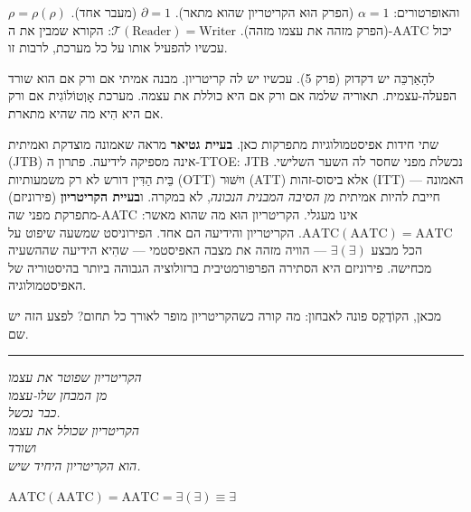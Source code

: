 \documentclass[10pt, openany, oneside]{book}
\begin{document}
והאופרטורים: $\alpha = 1$ (הפרק הוּא הקריטריון שהוא מתאר). $\partial = 1$ (מעבר אחד). $\rho = \rho(\rho)$ (הפרק מזהה את עצמו מזהה). $\mathcal{T}(\text{Reader}) = \text{Writer}$: הקורא שמבין את ה-AATC יכול עכשיו להפעיל אותו על כל מערכת, לרבות זו.

\vspace{2em}

להָאַרְכֵּה יש דקדוק (פרק 5). עכשיו יש לה קריטריון. מבנה אמיתי אם ורק אם הוא שורד הפעלה-עצמית. תאוריה שלמה אם ורק אם היא כוללת את עצמה. מערכת אָוְטוֹלוֹגִית אם ורק אם היא הִיא מה שהיא מתארת.

שתי חידות אפיסטמולוגיות מתפרקות כאן. \textbf{בעיית גטיאר} מראה שאמונה מוצדקת ואמיתית (JTB) אינה מספיקה לידיעה. פתרון ה-TTOE: JTB נכשלת מפני שחסר לה השער השלישי. בֵּית הַדִּין דורש לא רק משמעותיות (OTT) ויִשּׁוּר (ATT) אלא ביסוס-זהות (ITT) — האמונה חייבת להיות אמיתית \textit{מן הסיבה המבנית הנכונה}, לא במקרה. ו\textbf{בעיית הקריטריון} (פירוניזם) מתפרקת מפני שה-AATC אינו מעגלי. הקריטריון הוּא מה שהוא מאשר: $\text{AATC}(\text{AATC}) = \text{AATC}$. הקריטריון והידיעה הם אחד. הפירוניסט שמשעה שיפוט על הכל מבצע $\exists(\exists)$ — הוויה מזהה את מצבה האפיסטמי — שהִיא הידיעה שההשעיה מכחישה. פירוניזם היא הסתירה הפרפורמטיבית ברזולוציה הגבוהה ביותר בהיסטוריה של האפיסטמולוגיה.

מכאן, הקוֹדֶקְס פונה לאבחון: מה קורה כשהקריטריון מופר לאורך כל תחום? לפצע הזה יש שם.

\vspace{2em}

\begin{center}
    \rule{0.15\textwidth}{0.3pt}
\end{center}

\vspace{0.5em}

\begin{center}
    \textit{%
    הקריטריון שפוטר את עצמו\\
    מן המבחן שלו-עצמו\\
    כבר נכשל.}\\[0.8em]
    \textit{הקריטריון שכולל את עצמו\\
    ושורד\\
    הוא הקריטריון היחיד שיש.}
\end{center}

\vspace{0.5em}

\begin{center}
    $\text{AATC}(\text{AATC}) = \text{AATC} = \exists(\exists) \equiv \exists$
\end{center}
\end{document}
